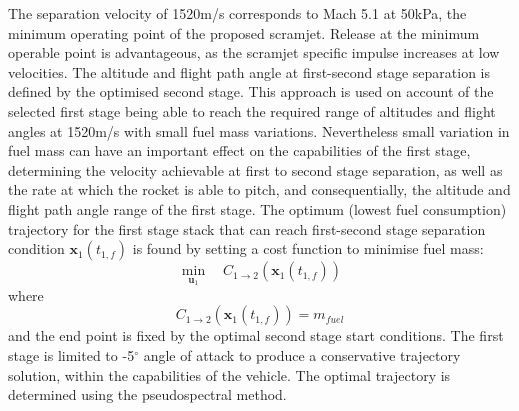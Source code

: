 \documentclass[journal]{new-aiaa}
\begin{document}
The separation velocity of 1520m/s corresponds to Mach 5.1 at 50kPa, the minimum operating point of the proposed scramjet\cite{Preller2017}. Release at the minimum operable point is advantageous, as the scramjet specific impulse increases at low velocities\cite{Preller2017}.
The altitude and flight path angle at first-second stage separation is defined by the optimised second stage. This approach is used on account of the selected first stage being able to reach the required range of altitudes and flight angles at 1520m/s  with small fuel mass variations. 
Nevertheless small variation in fuel mass can have an important effect on the capabilities of the first stage, determining the velocity achievable at first to second stage separation, as well as the rate at which the rocket is able to pitch, and consequentially, the altitude and flight path angle range of the first stage.
 The optimum (lowest fuel consumption) trajectory for the first stage stack that can reach first-second stage separation condition $\textbf{x}_1(t_{1,f})$ is found by setting a cost function to minimise fuel mass:
\begin{equation}
\min\limits_{\textbf{u}_1} \quad  C_{1 \rightarrow 2}(\textbf{x}_1(t_{1,f}))
\end{equation}
where
\begin{equation}
C_{1 \rightarrow 2}(\textbf{x}_1(t_{1,f})) = m_{fuel}
\end{equation}
and the end point is fixed by the optimal second stage start conditions. The first stage is limited to -5$^\circ$ angle of attack to produce a conservative trajectory solution, within the capabilities of the vehicle. The optimal trajectory is determined using the pseudospectral method.
\end{document}
